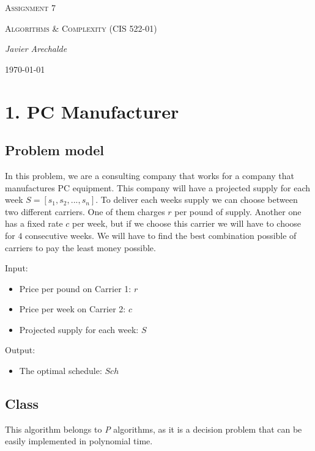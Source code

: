 \documentclass{article}
\begin{document}
\begin{titlepage}
	\centering
	{\scshape\LARGE Assignment 7\par}
	\vspace{1cm}
	{\scshape\Large Algorithms \& Complexity (CIS 522-01)\par}
	\vspace{1.5cm}
	{\Large\itshape Javier Arechalde\par}
	\vfill
	{\large \today\par}
\end{titlepage}

\section*{1. PC Manufacturer}

\subsection*{Problem model}

In this problem, we are a consulting company that works for a company that manufactures PC equipment. This company will have a projected supply for each week $S = [s_1,s_2,...,s_n]$. To deliver each weeks supply we can choose between two different carriers. One of them charges $r$ per pound of supply. Another one has a fixed rate $c$ per week, but if we choose this carrier we will have to choose for $4$ consecutive weeks. We will have to find the best combination possible of carriers to pay the least money possible.

Input:

\begin{itemize}
 \item Price per pound on Carrier 1: $r$
 \item Price per week on Carrier 2: $c$
 \item Projected supply for each week: $S$
\end{itemize} 

Output:

\begin{itemize}
 \item The optimal schedule: $Sch$
\end{itemize} 

\subsection*{Class}

This algorithm belongs to \textit{P} algorithms, as it is a decision problem that can be easily implemented in polynomial time.
\end{document}
